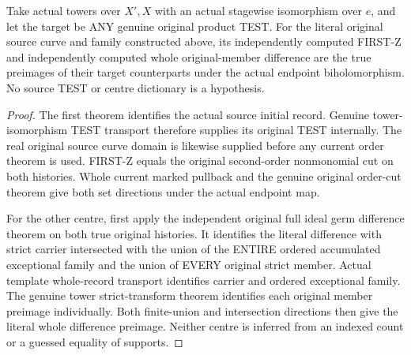 \begin{theorem}
\label{hir:sharp-original-curve-biholomorphic-base-stage-centres}
\leanok
Take actual towers over $X',X$ with an actual stagewise isomorphism
over $e$, and let the target be ANY genuine original product TEST.
For the literal original source curve and family constructed above,
its independently computed FIRST-Z and independently computed whole
original-member difference are the true preimages of their target
counterparts under the actual endpoint biholomorphism. No source TEST
or centre dictionary is a hypothesis.
\end{theorem}
\begin{proof}
The first theorem identifies the actual source initial record. Genuine
tower-isomorphism TEST transport therefore supplies its original TEST
internally. The real original source curve domain is likewise supplied
before any current order theorem is used. FIRST-Z equals the original
second-order nonmonomial cut on both histories. Whole current marked
pullback and the genuine original order-cut theorem give both set
directions under the actual endpoint map.

For the other centre, first apply the independent original full ideal
germ difference theorem on both true original histories. It identifies
the literal difference with strict carrier intersected with the union
of the ENTIRE ordered accumulated exceptional family and the union
of EVERY original strict member. Actual template whole-record
transport identifies carrier and ordered exceptional family. The
genuine tower strict-transform theorem identifies each original member
preimage individually. Both finite-union and intersection directions
then give the literal whole difference preimage. Neither centre is
inferred from an indexed count or a guessed equality of supports.
\end{proof}

